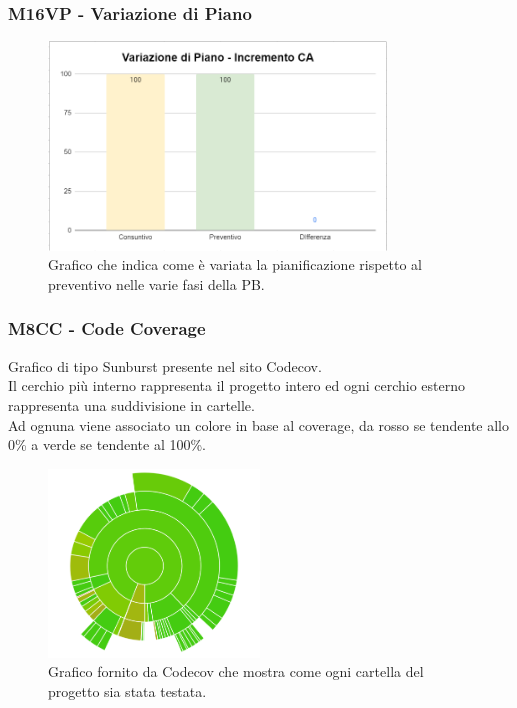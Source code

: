 \subsubsection{M16VP - Variazione di Piano}
\begin{figure}[H]
   \centering\includegraphics[width=0.8\textwidth, height=0.8\textheight,keepaspectratio]{images/CA-Variazione-di-Piano.png}
    \caption{Grafico che indica come è variata la pianificazione rispetto al preventivo nelle varie fasi della PB.}
\end{figure}  

\subsubsection{M8CC - Code Coverage}
Grafico di tipo Sunburst presente nel sito Codecov. \\
Il cerchio più interno rappresenta il progetto intero ed ogni cerchio esterno rappresenta una suddivisione in cartelle. \\
Ad ognuna viene associato un colore in base al coverage, da rosso se tendente allo 0\% a verde se tendente al 100\%.
\begin{figure}[H]
   \centering\includegraphics[width=0.5\textwidth, height=0.5\textheight,keepaspectratio]{images/graph.png}
    \caption{Grafico fornito da Codecov che mostra come ogni cartella del progetto sia stata testata.}
\end{figure}  

